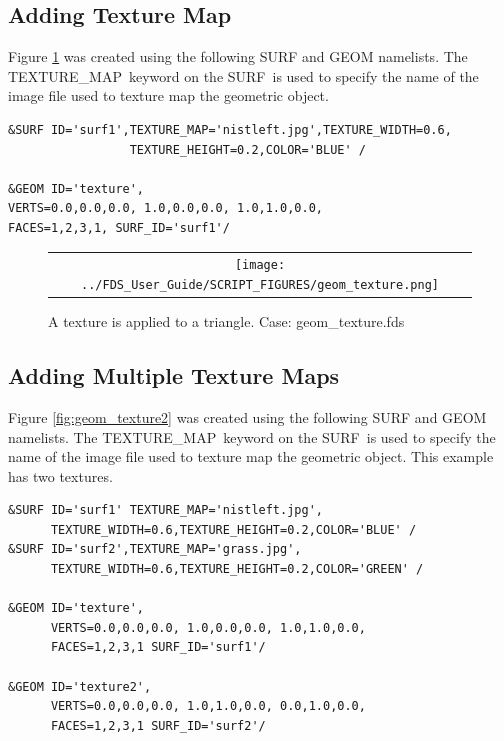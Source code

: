 \documentclass[11pt]{book}
\begin{document}
\FloatBarrier

\subsection{Adding Texture Map}

Figure \ref{fig:geom_texture} was created using the following {\ct SURF} and {\ct GEOM} namelists.
The {\ct TEXTURE\_MAP}\ keyword on the {\ct SURF}\ is used to specify the name of the image
file used to texture map the geometric object.
\begin{lstlisting}
&SURF ID='surf1',TEXTURE_MAP='nistleft.jpg',TEXTURE_WIDTH=0.6,
                 TEXTURE_HEIGHT=0.2,COLOR='BLUE' /

&GEOM ID='texture',
VERTS=0.0,0.0,0.0, 1.0,0.0,0.0, 1.0,1.0,0.0,
FACES=1,2,3,1, SURF_ID='surf1'/
\end{lstlisting}

\begin{figure}[!ht]
\begin{center}
\begin{tabular}{c}
 \texttt{[image: ../FDS\_User\_Guide/SCRIPT\_FIGURES/geom\_texture.png]}
  \end{tabular}
\end{center}
 \caption[Applying a texture map to a {\ct GEOM} surface]{A texture is applied to a triangle. Case: {\ct geom\_texture.fds}}
\label{fig:geom_texture}
\end{figure}

\FloatBarrier

\subsection{Adding Multiple Texture Maps}

Figure \ref{fig:geom_texture2} was created using the following {\ct SURF} and {\ct GEOM} namelists. The {\ct TEXTURE\_MAP}\ keyword on the {\ct SURF}\ is used to specify the name of the image file used to texture map the geometric object. This example has two textures.
\begin{lstlisting}
&SURF ID='surf1' TEXTURE_MAP='nistleft.jpg',
      TEXTURE_WIDTH=0.6,TEXTURE_HEIGHT=0.2,COLOR='BLUE' /
&SURF ID='surf2',TEXTURE_MAP='grass.jpg',
      TEXTURE_WIDTH=0.6,TEXTURE_HEIGHT=0.2,COLOR='GREEN' /

&GEOM ID='texture',
      VERTS=0.0,0.0,0.0, 1.0,0.0,0.0, 1.0,1.0,0.0,
      FACES=1,2,3,1 SURF_ID='surf1'/

&GEOM ID='texture2',
      VERTS=0.0,0.0,0.0, 1.0,1.0,0.0, 0.0,1.0,0.0,
      FACES=1,2,3,1 SURF_ID='surf2'/
\end{lstlisting}
\end{document}
